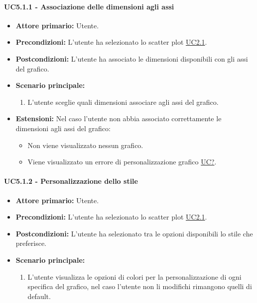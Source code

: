 \paragraph{UC5.1.1 - Associazione delle dimensioni agli assi}
\label{sec:UC5.1.1}
    \begin{itemize}
        \item \textbf{Attore primario:} Utente.
        \item \textbf{Precondizioni:} L'utente ha selezionato lo scatter plot \hyperref[sec:UC2.1]{UC2.1}.
	    \item \textbf{Postcondizioni:} L'utente ha associato le dimensioni disponibili con gli assi del grafico.
	    \item \textbf{Scenario principale:} 
	    \begin{enumerate}
	    		\item L'utente sceglie quali dimensioni associare agli assi del grafico.
		\end{enumerate}
	    \item \textbf{Estensioni:} Nel caso l'utente non abbia associato correttamente le dimensioni agli assi del grafico:
              \begin{itemize}
                  \item Non viene visualizzato nessun grafico.
                  \item Viene visualizzato un errore di personalizzazione grafico \hyperref[sec:UC - Errore di personalizzazione]{UC?}.
              \end{itemize}
    \end{itemize}
\paragraph{UC5.1.2 - Personalizzazione dello stile}
\label{sec:UC5.1.2}
    \begin{itemize}
        \item \textbf{Attore primario:} Utente.
        \item \textbf{Precondizioni:} L'utente ha selezionato lo scatter plot \hyperref[sec:UC2.1]{UC2.1}.
	    \item \textbf{Postcondizioni:} L'utente ha selezionato tra le opzioni disponibili lo stile che preferisce.
	    \item \textbf{Scenario principale:} 
	    \begin{enumerate}
	    		\item L'utente visualizza le opzioni di colori per la personalizzazione di ogni specifica del grafico, nel caso l'utente non li modifichi rimangono quelli di default.
		\end{enumerate}
    \end{itemize}

